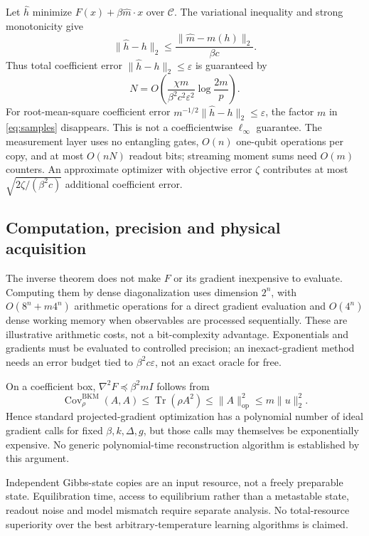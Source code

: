 \documentclass[11pt]{article}
\theoremstyle{remark}\newtheorem{remark}[theorem]{Remark}
\DeclareMathOperator{\Tr}{Tr}\DeclareMathOperator{\supp}{supp}\DeclareMathOperator{\ad}{ad}\DeclareMathOperator{\Var}{Var}\DeclareMathOperator{\Cov}{Cov}\DeclareMathOperator{\rank}{rank}\DeclareMathOperator{\dist}{dist}
\newcommand{\op}[1]{\|#1\|_{\mathrm{op}}}
\begin{document}
Let $\widehat h$ minimize $F(x)+\beta\widehat m\cdot x$ over $\mathcal C$. The variational inequality and strong monotonicity give
\[
 \|\widehat h-h\|_2\le\frac{\|\widehat m-m(h)\|_2}{\beta c}.
\]
Thus total coefficient error $\|\widehat h-h\|_2\le\varepsilon$ is guaranteed by
\begin{equation}\label{eq:samples}
 N=O\!\left(\frac{\chi m}{\beta^2c^2\varepsilon^2}
 \log\frac{2m}{p}\right).
\end{equation}
For root-mean-square coefficient error $m^{-1/2}\|\widehat h-h\|_2\le\varepsilon$, the factor $m$ in \eqref{eq:samples} disappears. This is not a coefficientwise $\ell_\infty$ guarantee. The measurement layer uses no entangling gates, $O(n)$ one-qubit operations per copy, and at most $O(nN)$ readout bits; streaming moment sums need $O(m)$ counters. An approximate optimizer with objective error $\zeta$ contributes at most $\sqrt{2\zeta/(\beta^2c)}$ additional coefficient error.

\subsection{Computation, precision and physical acquisition}
The inverse theorem does not make $F$ or its gradient inexpensive to evaluate. Computing them by dense diagonalization uses dimension $2^n$, with $O(8^n+m4^n)$ arithmetic operations for a direct gradient evaluation and $O(4^n)$ dense working memory when observables are processed sequentially. These are illustrative arithmetic costs, not a bit-complexity advantage. Exponentials and gradients must be evaluated to controlled precision; an inexact-gradient method needs an error budget tied to $\beta^2c\varepsilon$, not an exact oracle for free.

On a coefficient box, $\nabla^2F\preceq\beta^2m I$ follows from
\[\Cov^{\mathrm{BKM}}_\rho(A,A)\le\Tr(\rho A^2)\le\op A^2\le m\|u\|_2^2.\] Hence standard projected-gradient optimization has a polynomial number of ideal gradient calls for fixed $\beta,k,\Delta,g$, but those calls may themselves be exponentially expensive. No generic polynomial-time reconstruction algorithm is established by this argument.

Independent Gibbs-state copies are an input resource, not a freely preparable state. Equilibration time, access to equilibrium rather than a metastable state, readout noise and model mismatch require separate analysis. No total-resource superiority over the best arbitrary-temperature learning algorithms is claimed.
\end{document}
